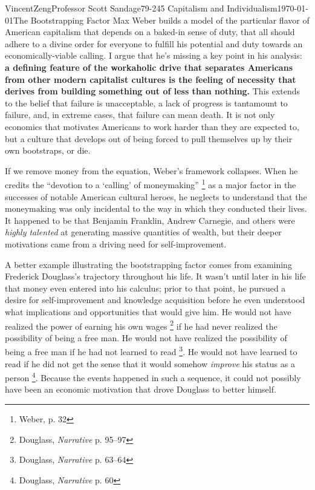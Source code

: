 \documentclass[12pt]{article}
\begin{document}
\begin{mla}{Vincent}{Zeng}{Professor Scott Sandage}{79-245 Capitalism and Individualism}{\today}{The Bootstrapping
Factor} 
	Max Weber builds a model of the particular flavor of American
	capitalism that depends on a baked-in sense of duty, that all should
	adhere to a divine order for everyone to fulfill his potential and duty
	towards an economically-viable calling. I argue that he's missing a key
	point in his analysis: \textbf{a defining feature of the workaholic drive
	that separates Americans from other modern capitalist cultures is the
	feeling of necessity that derives from building something out of less
	than nothing.} This extends to the belief that failure is unacceptable,
	a lack of progress is tantamount to failure, and, in extreme cases,
	that failure can mean death. It is not only economics that motivates
	Americans to work harder than they are expected to, but a culture that
	develops out of being forced to pull themselves up by their own
	bootstraps, or die.

	If we remove money from the equation, Weber's framework collapses. When
	he credits the ``devotion to a `calling' of moneymaking''
	\footnote{Weber, p. 32} as a major factor in the successes of notable
	American cultural heroes, he neglects to understand that the
	moneymaking was only incidental to the way in which they conducted
	their lives. It happened to be that Benjamin Franklin, Andrew Carnegie,
	and others were \textit{highly talented} at generating massive
	quantities of wealth, but their deeper motivations came from a driving
	need for self-improvement.

	A better example illustrating the bootstrapping factor comes from
	examining Frederick Douglass's trajectory throughout his life. It
	wasn't until later in his life that money even entered into his
	calculus; prior to that point, he pursued a desire for self-improvement
	and knowledge acquisition before he even understood what implications
	and opportunities that would give him. He would not have realized the
	power of earning his own wages \footnote{Douglass, \textit{Narrative}
	p. 95--97} if he had never realized the possibility of being a free
	man. He would not have realized the possibility of being a free man if
	he had not learned to read \footnote{Douglass, \textit{Narrative} p.
	63--64}. He would not have learned to read if he did not get the sense
	that it would somehow \textit{improve} his status as a person
	\footnote{Douglass, \textit{Narrative} p. 60}. Because the events
	happened in such a sequence, it could not possibly have been an
	economic motivation that drove Douglass to better himself.


\end{mla}
\end{document}
